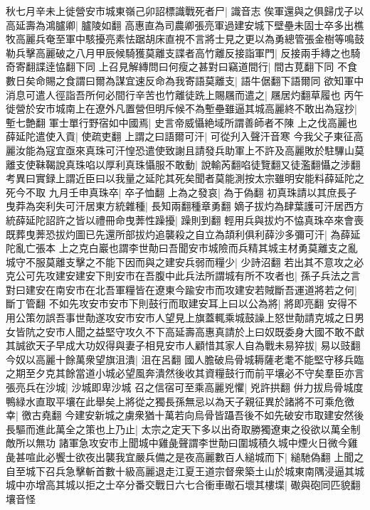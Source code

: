 秋七月辛未上徙營安市城東嶺己卯詔標識戰死者尸|{
	識音志}
俟軍還與之俱歸戊子以高延壽為鴻臚卿|{
	臚陵如翻}
高惠直為司農卿張亮軍過建安城下壁壘未固士卒多出樵牧高麗兵奄至軍中駭擾亮素怯踞胡床直視不言將士見之更以為勇總管張金樹等鳴鼓勒兵擊高麗破之八月甲辰候騎獲莫離支諜者高竹離反接詣軍門|{
	反接兩手縳之也騎奇寄翻諜逹恊翻下同}
上召見解縳問曰何瘦之甚對曰竊道間行|{
	間古莧翻下同}
不食數日矣命賜之食謂曰爾為謀宜速反命為我寄語莫離支|{
	語牛倨翻下語爾同}
欲知軍中消息可遣人徑詣吾所何必間行辛苦也竹離徒跣上賜屩而遣之|{
	屩居灼翻草履也}
丙午徙營於安市城南上在遼外凡置營但明斥候不為塹壘雖逼其城高麗終不敢出為寇抄|{
	塹七艶翻}
軍士單行野宿如中國焉|{
	史言帝威懾絶域所謂善師者不陳}
上之伐高麗也薛延陀遣使入貢|{
	使疏吏翻}
上謂之曰語爾可汗|{
	可從刋入聲汗音寒}
今我父子東征高麗汝能為寇宜亟來真珠可汗惶恐遣使致謝且請發兵助軍上不許及高麗敗於駐驆山莫離支使靺鞨說真珠啗以厚利真珠懾服不敢動|{
	說輸芮翻啗徒覽翻又徒濫翻懾之涉翻　考異曰實録上謂近臣曰以我量之延陀其死矣聞者莫能測按太宗雖明安能料薛延陀之死今不取}
九月壬申真珠卒|{
	卒子恤翻}
上為之發哀|{
	為于偽翻}
初真珠請以其庶長子曳莽為突利失可汗居東方統雜種|{
	長知兩翻種章勇翻}
嫡子拔灼為肆葉護可汗居西方統薛延陀詔許之皆以禮冊命曳莾性躁擾|{
	躁則到翻}
輕用兵與拔灼不恊真珠卒來會喪既葬曳莾恐拔灼圖已先還所部拔灼追襲殺之自立為頡利俱利薛沙多彌可汗|{
	為薛延陀亂亡張本}
上之克白巖也謂李世勣曰吾聞安市城險而兵精其城主材勇莫離支之亂城守不服莫離支擊之不能下因而與之建安兵弱而糧少|{
	少詩沼翻}
若出其不意攻之必克公可先攻建安建安下則安市在吾腹中此兵法所謂城有所不攻者也|{
	孫子兵法之言}
對曰建安在南安市在北吾軍糧皆在遼東今踰安市而攻建安若賊斷吾運道將若之何|{
	斷丁管翻}
不如先攻安市安市下則鼓行而取建安耳上曰以公為將|{
	將即亮翻}
安得不用公策勿誤吾事世勣遂攻安市安市人望見上旗蓋輒乘城鼓譟上怒世勣請克城之日男女皆阬之安市人聞之益堅守攻久不下高延壽高惠真請於上曰奴既委身大國不敢不獻其誠欲天子早成大功奴得與妻子相見安市人顧惜其家人自為戰未易猝拔|{
	易以豉翻}
今奴以高麗十餘萬衆望旗沮潰|{
	沮在呂翻}
國人膽破烏骨城耨薩老耄不能堅守移兵臨之期至夕克其餘當道小城必望風奔潰然後收其資糧鼓行而前平壤必不守矣羣臣亦言張亮兵在沙城|{
	沙城即卑沙城}
召之信宿可至乘高麗兇懼|{
	兇許拱翻}
倂力拔烏骨城度鴨緑水直取平壤在此舉矣上將從之獨長孫無忌以為天子親征異於諸將不可乘危徼幸|{
	徼古堯翻}
今建安新城之虜衆猶十萬若向烏骨皆躡吾後不如先破安市取建安然後長驅而進此萬全之策也上乃止|{
	太宗之定天下多以出奇取勝獨遼東之役欲以萬全制敵所以無功}
諸軍急攻安市上聞城中雞彘聲謂李世勣曰圍城積久城中煙火日微今雞彘甚喧此必饗士欲夜出襲我宜嚴兵備之是夜高麗數百人縋城而下|{
	縋馳偽翻}
上聞之自至城下召兵急擊斬首數十級高麗退走江夏王道宗督衆築土山於城東南隅浸逼其城城中亦增高其城以拒之士卒分番交戰日六七合衝車礮石壞其樓堞|{
	礮與砲同匹貌翻壤音怪}
